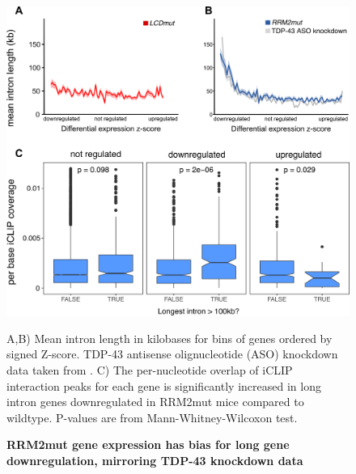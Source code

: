 \begin{figure}[h!]
	\centering
	\includegraphics[width=12cm]{Figures/05_tdp_mice/long_genes_multi.png}
	\caption{\textbf{RRM2mut gene expression has bias for long gene downregulation, mirroring TDP-43 knockdown data}}
	A,B) Mean intron length in kilobases for bins of genes ordered by signed Z-score. TDP-43 antisense olignucleotide (ASO) knockdown data taken from \cite{Polymenidou2011-hs}. C) The per-nucleotide overlap of iCLIP interaction peaks for each gene is significantly increased in long intron genes downregulated in RRM2mut mice compared to wildtype. P-values are from Mann-Whitney-Wilcoxon test.
	\label{fig:long_genes}
\end{figure}

